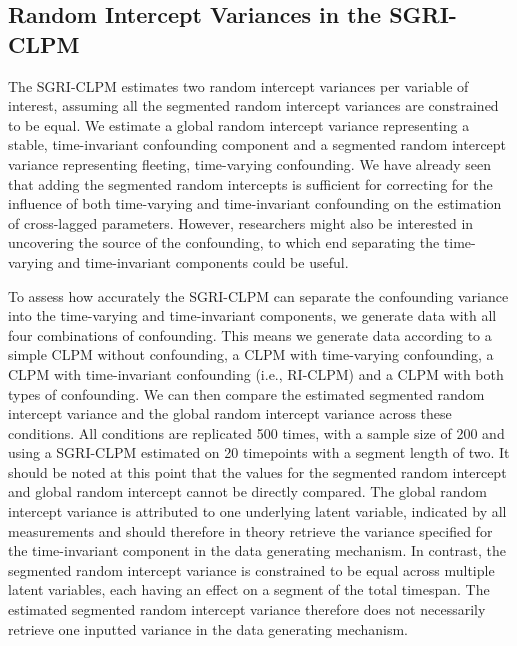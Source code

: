 \documentclass[
  man,
  floatsintext,
  longtable,
  nolmodern,
  notxfonts,
  notimes,
  colorlinks=true,linkcolor=blue,citecolor=blue,urlcolor=blue]{apa7}
\begin{document}
\subsection{Random Intercept Variances in the
SGRI-CLPM}\label{random-intercept-variances-in-the-sgri-clpm}

The SGRI-CLPM estimates two random intercept variances per variable of
interest, assuming all the segmented random intercept variances are
constrained to be equal. We estimate a global random intercept variance
representing a stable, time-invariant confounding component and a
segmented random intercept variance representing fleeting, time-varying
confounding. We have already seen that adding the segmented random
intercepts is sufficient for correcting for the influence of both
time-varying and time-invariant confounding on the estimation of
cross-lagged parameters. However, researchers might also be interested
in uncovering the source of the confounding, to which end separating the
time-varying and time-invariant components could be useful.

To assess how accurately the SGRI-CLPM can separate the confounding
variance into the time-varying and time-invariant components, we
generate data with all four combinations of confounding. This means we
generate data according to a simple CLPM without confounding, a CLPM
with time-varying confounding, a CLPM with time-invariant confounding
(i.e., RI-CLPM) and a CLPM with both types of confounding. We can then
compare the estimated segmented random intercept variance and the global
random intercept variance across these conditions. All conditions are
replicated 500 times, with a sample size of 200 and using a SGRI-CLPM
estimated on 20 timepoints with a segment length of two. It should be
noted at this point that the values for the segmented random intercept
and global random intercept cannot be directly compared. The global
random intercept variance is attributed to one underlying latent
variable, indicated by all measurements and should therefore in theory
retrieve the variance specified for the time-invariant component in the
data generating mechanism. In contrast, the segmented random intercept
variance is constrained to be equal across multiple latent variables,
each having an effect on a segment of the total timespan. The estimated
segmented random intercept variance therefore does not necessarily
retrieve one inputted variance in the data generating mechanism.
\end{document}
